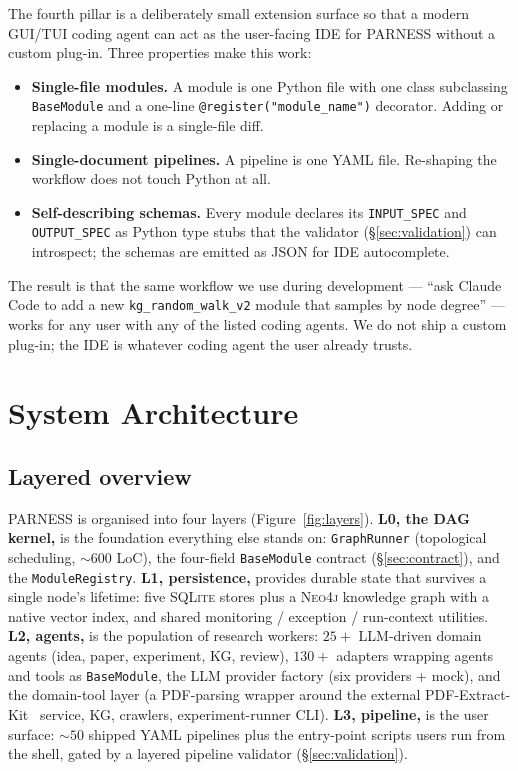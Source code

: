 \documentclass{article}
\newcommand{\parness}{\textsf{PARNESS}}
\newcommand{\code}[1]{\texttt{\small #1}}
\begin{document}
The fourth pillar is a deliberately small extension surface so that a
modern GUI/TUI coding agent can act as the user-facing IDE for
\parness{} without a custom plug-in. Three properties make this work:

\begin{itemize}[leftmargin=1.4em,itemsep=0.15em]
\item \textbf{Single-file modules.} A module is one Python file with
one class subclassing \code{BaseModule} and a one-line
\code{@register("module\_name")} decorator. Adding or replacing a
module is a single-file diff.
\item \textbf{Single-document pipelines.} A pipeline is one YAML file.
Re-shaping the workflow does not touch Python at all.
\item \textbf{Self-describing schemas.} Every module declares its
\code{INPUT\_SPEC} and \code{OUTPUT\_SPEC} as Python type stubs that the
validator (\S\ref{sec:validation}) can introspect; the schemas are
emitted as JSON for IDE autocomplete.
\end{itemize}

The result is that the same workflow we use during development ---
``ask Claude Code to add a new \code{kg\_random\_walk\_v2} module that
samples by node degree'' --- works for any user with any of the listed
coding agents. We do not ship a custom plug-in; the IDE is whatever
coding agent the user already trusts.

\section{System Architecture}
\label{sec:arch}

\subsection{Layered overview}
\parness{} is organised into four layers (Figure~\ref{fig:layers}).
\textbf{L0, the DAG kernel,} is the foundation everything else stands on:
\code{GraphRunner} (topological scheduling, $\sim\!600$ LoC), the
four-field \code{BaseModule} contract (\S\ref{sec:contract}), and the
\code{ModuleRegistry}. \textbf{L1, persistence,} provides durable state
that survives a single node's lifetime: five \textsc{SQLite} stores
plus a \textsc{Neo4j} knowledge graph with a native vector index, and
shared monitoring / exception / run-context utilities. \textbf{L2,
agents,} is the population of research workers: $25{+}$ LLM-driven
domain agents (idea, paper, experiment, KG, review), $130{+}$ adapters
wrapping agents and tools as \code{BaseModule}, the LLM provider
factory (six providers + mock), and the domain-tool layer (a
PDF-parsing wrapper around the external PDF-Extract-Kit~\cite{pdfextractkit}
service, KG, crawlers, experiment-runner CLI). \textbf{L3, pipeline,} is the user surface:
$\sim\!50$ shipped YAML pipelines plus the entry-point scripts users
run from the shell, gated by a layered pipeline validator
(\S\ref{sec:validation}).
\end{document}
